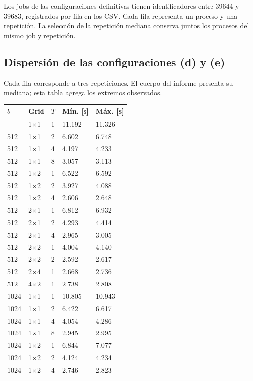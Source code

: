 \documentclass[
  spanish,
  11pt,
  a4paper,
]{article}
\newcounter{none} %
\begin{document}
Los jobs de las configuraciones definitivas tienen identificadores entre
39644 y 39683, registrados por fila en los CSV. Cada fila representa un
proceso y una repetición. La selección de la repetición mediana conserva
juntos los procesos del mismo job y repetición.

\subsection{Dispersión de las configuraciones (d) y
(e)}\label{dispersiuxf3n-de-las-configuraciones-d-y-e}

Cada fila corresponde a tres repeticiones. El cuerpo del informe
presenta su mediana; esta tabla agrega los extremos observados.

{\def\LTcaptype{none} %
\begin{longtable}[]{@{}lllll@{}}
\toprule\noalign{}
\(b\) & Grid & \(T\) & Mín. {[}s{]} & Máx. {[}s{]} \\
\midrule\noalign{}
\endhead
\bottomrule\noalign{}
\endlastfoot
512 & 1×1 & 1 & 11.192 & 11.326 \\
512 & 1×1 & 2 & 6.602 & 6.748 \\
512 & 1×1 & 4 & 4.197 & 4.233 \\
512 & 1×1 & 8 & 3.057 & 3.113 \\
512 & 1×2 & 1 & 6.522 & 6.592 \\
512 & 1×2 & 2 & 3.927 & 4.088 \\
512 & 1×2 & 4 & 2.606 & 2.648 \\
512 & 2×1 & 1 & 6.812 & 6.932 \\
512 & 2×1 & 2 & 4.293 & 4.414 \\
512 & 2×1 & 4 & 2.965 & 3.005 \\
512 & 2×2 & 1 & 4.004 & 4.140 \\
512 & 2×2 & 2 & 2.592 & 2.617 \\
512 & 2×4 & 1 & 2.668 & 2.736 \\
512 & 4×2 & 1 & 2.738 & 2.808 \\
1024 & 1×1 & 1 & 10.805 & 10.943 \\
1024 & 1×1 & 2 & 6.422 & 6.617 \\
1024 & 1×1 & 4 & 4.054 & 4.286 \\
1024 & 1×1 & 8 & 2.945 & 2.995 \\
1024 & 1×2 & 1 & 6.844 & 7.077 \\
1024 & 1×2 & 2 & 4.124 & 4.234 \\
1024 & 1×2 & 4 & 2.746 & 2.823 \\

\end{longtable}}
\end{document}
